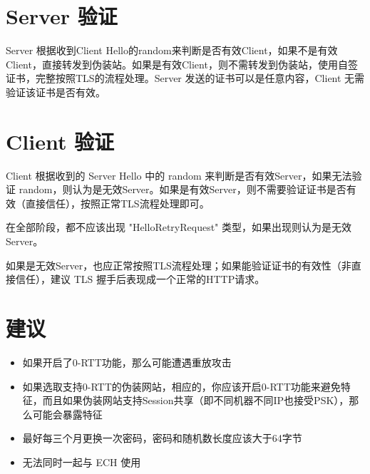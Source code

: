 \section{Server 验证}
Server 根据收到Client Hello的random来判断是否有效Client，如果不是有效Client，直接转发到伪装站。如果是有效Client，则不需转发到伪装站，使用自签证书，完整按照TLS的流程处理。Server 发送的证书可以是任意内容，Client 无需验证该证书是否有效。

\section{Client 验证}
Client 根据收到的 Server Hello 中的 random 来判断是否有效Server，如果无法验证 random，则认为是无效Server。如果是有效Server，则不需要验证证书是否有效（直接信任），按照正常TLS流程处理即可。

在全部阶段，都不应该出现 "HelloRetryRequest" 类型，如果出现则认为是无效Server。

如果是无效Server，也应正常按照TLS流程处理；如果能验证证书的有效性（非直接信任），建议 TLS 握手后表现成一个正常的HTTP请求。

\section{建议}
\begin{itemize}
	\item 如果开启了0-RTT功能，那么可能遭遇重放攻击
	\item 如果选取支持0-RTT的伪装网站，相应的，你应该开启0-RTT功能来避免特征，而且如果伪装网站支持Session共享（即不同机器不同IP也接受PSK），那么可能会暴露特征
	\item 最好每三个月更换一次密码，密码和随机数长度应该大于64字节
	\item 无法同时一起与 ECH\cite{ietf-tls-esni-16} 使用
\end{itemize}
